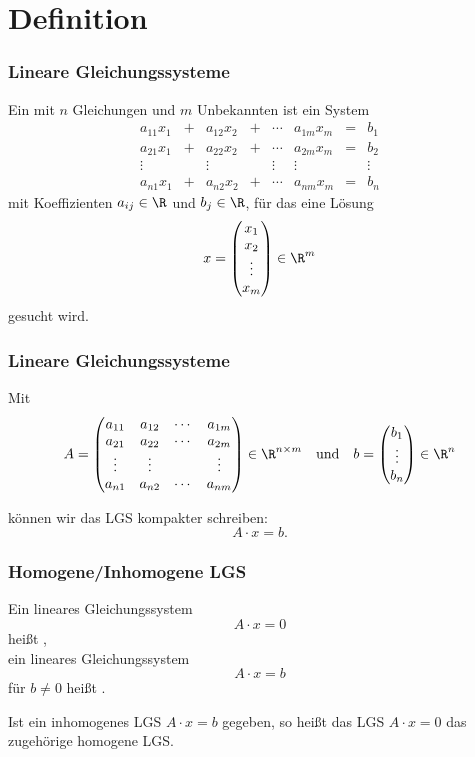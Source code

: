 \section{Definition}
\makeSectionDividerPage
%
%
\begin{frame}\frametitle{Lineare Gleichungssysteme}

	Ein 	 mit $n$ Gleichungen und $m$ Unbekannten ist ein System
	$$
		\begin{array}{ccccccccc}
			a_{11}x_1	&+	&a_{12}x_2	&+	&\cdots	&a_{1m}x_m	&=	& b_1 \\
			a_{21}x_1	&+	&a_{22}x_2 	&+	&\cdots	&a_{2m}x_m	&=	& b_2 \\
			\vdots	&	&\vdots		&	&\vdots	&\vdots		&	& \vdots\\
			a_{n1}x_1	&+ 	&a_{n2}x_2 	&+	&\cdots	&a_{nm}x_m	&=	& b_n 
		\end{array}
	$$
	mit Koeffizienten $a_{ij}\in\R$ und $b_j\in \R$, für das eine Lösung
	$$	
		x
		=
		\begin{pmatrix} 
			x_1\\
			x_2\\
			\vdots\\
			x_m
		\end{pmatrix} 
		\in \R^m
	$$
	gesucht wird.
	
\end{frame}
%
%
\begin{frame}\frametitle{Lineare Gleichungssysteme}

	Mit
	$$
		A 
		=
		\begin{pmatrix}
			a_{11}	& a_{12}	&\cdots 	&a_{1m}\\
			a_{21}	& a_{22}	&\cdots 	&a_{2m}\\
			\vdots	& \vdots	&            	&\vdots \\
			a_{n1}	& a_{n2}	&\cdots	&a_{nm}
		\end{pmatrix}
		\in \R^{n\times m}
		\quad
		\text{und}
		\quad
		b
		=
		\begin{pmatrix}
			b_1\\
			\vdots\\
			b_n
		\end{pmatrix}		
		\in \R^n
	$$
	
	\vspace{2mm}
	können wir das LGS kompakter schreiben:
	$$
		A\cdot x = b.
	$$
	
\end{frame}
%
%
\begin{frame}\frametitle{Homogene/Inhomogene LGS}

	Ein lineares Gleichungssystem
	$$
		A\cdot x = 0
	$$
	hei{\ss}t ,\\[2mm]
	
	ein lineares Gleichungssystem
	$$
		A\cdot x = b
	$$
	für $b\neq 0$ hei{\ss}t .
	
	\pause
	\vspace{5mm}
	Ist ein inhomogenes LGS 
	$A\cdot x = b$ 
	gegeben, so hei{\ss}t das LGS $A\cdot x = 0$ das zugehörige homogene LGS.
	
\end{frame}
%

